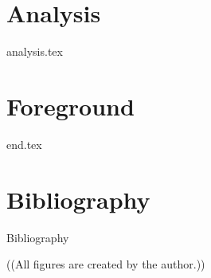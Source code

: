 \documentclass[UKenglish,aspectratio=169]{beamer}
\begin{document}


\section{Analysis}\label{sec:analysis}
{{analysis.tex}}

\section{Foreground}\label{sec:end}
{{end.tex}}










\section*{Bibliography}
\begin{frame}{Bibliography}
  \begin{footnotesize}
    
    \textcolor{uiogrey}{((All figures are created by the author.))}
  \end{footnotesize}
\end{frame}
\end{document}
